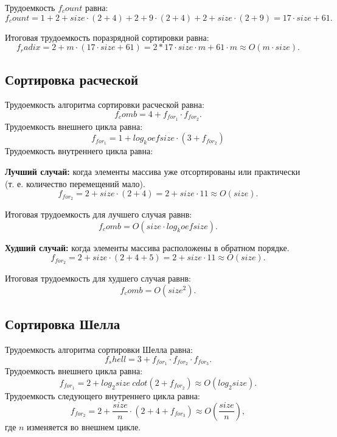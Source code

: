 Трудоемкость $f_count$ равна:
\begin{equation}
	f_count = 1 + 2 + size \cdot (2 + 4) + 2 + 9 \cdot(2 + 4) + 2 + size \cdot (2 + 9) = 17 \cdot size + 61.
\end{equation}

Итоговая трудоемкость поразрядной сортировки равна:
\begin{equation}
	f_radix = 2 + m \cdot (17 \cdot size + 61) = 2 * 17 \cdot size \cdot m + 61 \cdot m \approx O(m \cdot size).
\end{equation}

\subsection*{Сортировка расческой}
Трудоемкость алгоритма сортировки расческой равна:
\begin{equation}
	f_comb = 4 + f_{for_1} \cdot f_{for_2}.
\end{equation}
Трудоемкость внешнего цикла равна:
\begin{equation}
	f_{for_1} = 1 + log_koef{size} \cdot(3 + f_{for_2}) 
\end{equation}
Трудоемкость внутреннего цикла равна:

\textbf{Лучший случай:} когда элементы массива уже отсортированы или практически (т. е. количество перемещений мало).
\begin{equation}
	f_{for_2} = 2 + size \cdot(2 + 4) =  2 + size \cdot 11 \approx O(size).
\end{equation}

Итоговая трудоемкость для лучшего случая равнв: 
\begin{equation}
	f_comb = O(size \cdot log_koef{size}).
\end{equation}

\textbf{Худший случай:} когда элементы массива расположены в обратном порядке.
\begin{equation}
	f_{for_2} = 2 + size \cdot(2 + 4 + 5) =  2 + size \cdot 11 \approx O(size).
\end{equation}

Итоговая трудоемкость для худшего случая равнв: 
\begin{equation}
	f_comb = O(size^2).
\end{equation}

\subsection*{Сортировка Шелла}
Трудоемкость алгоритма сортировки Шелла равна:
\begin{equation}
	f_shell = 3 + f_{for_1} \cdot f_{for_2} \cdot f_{for_3}.
\end{equation}
Трудоемкость внешнего цикла равна:
\begin{equation}
	f_{for_1} = 2 + log_2{size} \ cdot (2 + f_{for_2}) \approx O(log_2{size}) .
\end{equation}
Трудоемкость следующего внутреннего цикла равна:
\begin{equation}
	f_{for_2} = 2 + \frac{size}{n} \cdot (2 + 4 + f_{for_3}) \approx O(\frac{size}{n}), 
\end{equation}
где $n$ изменяется во внешнем цикле.

